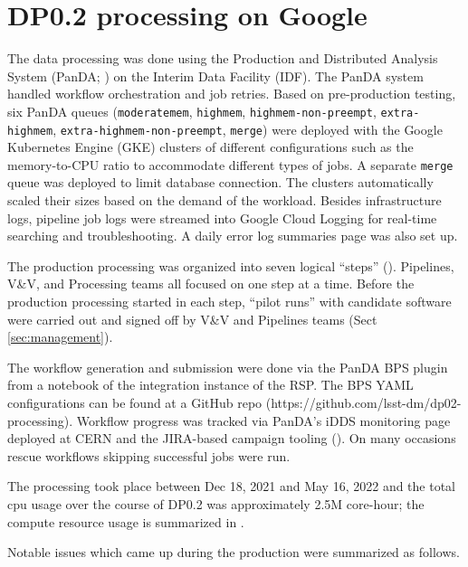 \section{DP0.2 processing on Google} \label{sec:processing}

The data processing was done using the Production and Distributed Analysis System (PanDA; ) on the Interim Data Facility (IDF).
The PanDA system handled workflow orchestration and job retries.
Based on pre-production testing, six PanDA queues (\texttt{moderatemem}, \texttt{highmem}, \texttt{highmem-non-preempt}, \texttt{extra-highmem}, \texttt{extra-highmem-non-preempt}, \texttt{merge}) were deployed with the Google Kubernetes Engine (GKE) clusters of different configurations such as the memory-to-CPU ratio to accommodate different types of jobs.
A separate \texttt{merge} queue was deployed to limit database connection.
The clusters automatically scaled their sizes based on the demand of the workload.
Besides infrastructure logs, pipeline job logs were streamed into Google Cloud Logging for real-time searching and troubleshooting.
A daily error log summaries page was also set up.


The production processing was organized into seven logical ``steps'' ().
Pipelines, V\&V, and Processing teams all focused on one step at a time.
Before the production processing started in each step, ``pilot runs'' with candidate software were carried out and signed off by V\&V and Pipelines teams
(Sect \ref{sec:management}).

The workflow generation and submission were done via the PanDA BPS plugin from a notebook of the integration instance of the RSP.
The BPS YAML configurations can be found at a GitHub repo (https://github.com/lsst-dm/dp02-processing).
Workflow progress was tracked via PanDA's iDDS monitoring page deployed at CERN and the JIRA-based campaign tooling ().
On many occasions rescue workflows skipping successful jobs were run.

The processing took place  between Dec 18, 2021 and May 16, 2022 and the total cpu usage over the course of DP0.2 was approximately 2.5M core-hour; the compute resource usage is summarized in .


Notable issues which came up during the production were summarized as follows.

